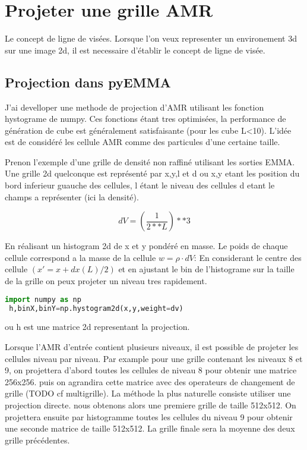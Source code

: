 \section{Projeter une grille AMR}

Le concept de ligne de visées.
Lorsque l'on veux representer un environement 3d sur une image 2d, il est necessaire d'établir le concept de ligne de visée.


\subsection{Projection dans pyEMMA}
J'ai develloper une methode de projection d'AMR utilisant les fonction hystograme de numpy.
Ces fonctions étant tres optimisées, la performance de génération de cube est généralement satisfaisante (pour les cube L<10).
L'idée est de considéré les cellule AMR comme des particules d'une certaine taille.

Prenon l'exemple d'une grille de densité non raffiné utilisant les sorties EMMA.
Une grille 2d  quelconque est représenté par x,y,l et d ou x,y etant les position du bord inferieur guauche des cellules, l étant le niveau des cellules d etant le champs a représenter (ici la densité).

\begin{equation}
dV= \left( \frac{1}{2**L }\right) **3
\end{equation} 

En réalisant un histogram 2d de x et y pondéré en masse.
Le poids de chaque cellule correspond a la masse de la cellule $w = \rho \cdot dV$:
En considerant le centre des cellule $(x' = x+dx(L) /2)$ et en ajustant le bin de l'histograme sur la taille de la grille on peux projeter un niveau tres rapidement.

\begin{lstlisting}[float=bth,language=python,frame=tb,caption={lprojection de l'AMR par la méthode des histogramme Numpy},label=lst:useless]
 import numpy as np
 h,binX,binY=np.hystogram2d(x,y,weight=dv)
\end{lstlisting}

ou h est une matrice 2d representant la projection.


Lorsque l'AMR d'entrée contient plusieurs niveaux, il est possible de projeter les cellules niveau par niveau.
Par example pour une grille contenant les niveaux 8 et 9, on projettera d'abord toutes les cellules de niveau 8 pour obtenir une matrice 256x256.
puis on agrandira cette matrice avec des operateurs de changement de grille (TODO cf multigrille).
La méthode la plus naturelle consiste utiliser une projection directe.
nous obtenons alors une premiere grille de taille 512x512.
On projettera ensuite par histogramme toutes les cellules du niveau  9 pour obtenir une seconde matrice de taille 512x512.
La grille finale sera la moyenne des deux grille précédentes.

